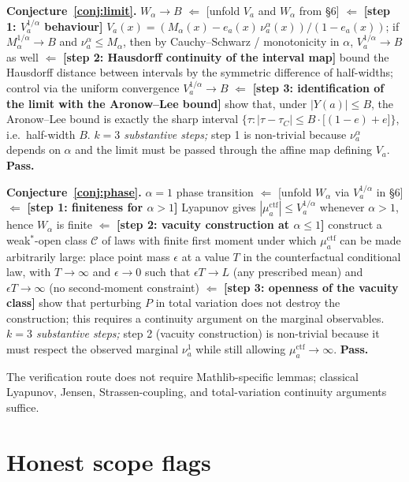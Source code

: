 \documentclass[11pt]{article}
\theoremstyle{definition}
\theoremstyle{plain}
\theoremstyle{remark}
\begin{document}
\textbf{Conjecture~\ref{conj:limit}.}
$W_\alpha \to B$
$\Leftarrow$ [unfold $V_a$ and $W_\alpha$ from \S6]
$\Leftarrow$ \textbf{[step 1: $V_a^{1/\alpha}$ behaviour]} $V_a(x) = (M_\alpha(x) - e_a(x)\,\nu_a^\alpha(x))/(1-e_a(x))$;
if $M_\alpha^{1/\alpha} \to B$ and $\nu_a^\alpha \le M_\alpha$, then by Cauchy--Schwarz / monotonicity in $\alpha$,
$V_a^{1/\alpha} \to B$ as well
$\Leftarrow$ \textbf{[step 2: Hausdorff continuity of the interval map]} bound the
Hausdorff distance between intervals by the symmetric difference of half-widths;
control via the uniform convergence $V_a^{1/\alpha} \to B$
$\Leftarrow$ \textbf{[step 3: identification of the limit with the Aronow--Lee bound]}
show that, under $|Y(a)| \le B$, the Aronow--Lee bound is exactly the sharp interval
$\{\tau : |\tau - \tau_C| \le B\cdot\bigl[(1-e) + e\bigr]\}$, i.e.~half-width $B$.
\emph{$k = 3$ substantive steps;} step 1 is non-trivial because $\nu_a^\alpha$ depends
on $\alpha$ and the limit must be passed through the affine map defining $V_a$.
\textbf{Pass.}

\textbf{Conjecture~\ref{conj:phase}.}
$\alpha=1$ phase transition
$\Leftarrow$ [unfold $W_\alpha$ via $V_a^{1/\alpha}$ in \S6]
$\Leftarrow$ \textbf{[step 1: finiteness for $\alpha>1$]} Lyapunov gives
$|\mu_a^{\mathrm{ctf}}| \le V_a^{1/\alpha}$ whenever $\alpha>1$, hence $W_\alpha$ is finite
$\Leftarrow$ \textbf{[step 2: vacuity construction at $\alpha\le 1$]} construct a
weak$^*$-open class $\mathcal{C}$ of laws with finite first moment under which
$\mu_a^{\mathrm{ctf}}$ can be made arbitrarily large: place point mass $\epsilon$ at
a value $T$ in the counterfactual conditional law, with $T \to \infty$ and
$\epsilon\to 0$ such that $\epsilon T \to L$ (any prescribed mean) and
$\epsilon T \to \infty$ (no second-moment constraint)
$\Leftarrow$ \textbf{[step 3: openness of the vacuity class]} show that perturbing
$P$ in total variation does not destroy the construction; this requires a continuity
argument on the marginal observables.
\emph{$k = 3$ substantive steps;} step 2 (vacuity construction) is non-trivial because
it must respect the observed marginal $\nu_a^1$ while still allowing $\mu_a^{\mathrm{ctf}}\to\infty$.
\textbf{Pass.}

The verification route does not require Mathlib-specific lemmas; classical Lyapunov,
Jensen, Strassen-coupling, and total-variation continuity arguments suffice.

\section{Honest scope flags}
\end{document}
